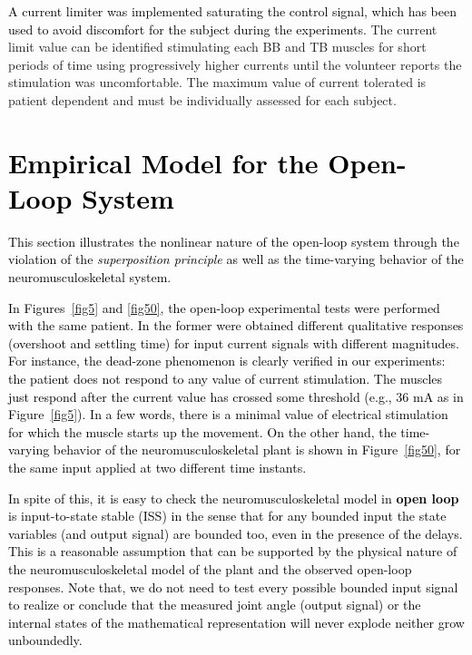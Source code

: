 \documentclass[review]{elsarticle}
\begin{document}
\textcolor{black}{
A current limiter was implemented saturating the control signal, which has been used to avoid discomfort for the subject during the experiments.} The current limit value can be identified stimulating each BB and TB muscles for short periods of time using progressively higher currents until the volunteer reports the stimulation was uncomfortable. The maximum value of current tolerated is patient dependent and must be individually assessed for each subject. 



\section{\textcolor{black}{Empirical Model for the Open-Loop System}}
\label{empirical}


\textcolor{black}{This section illustrates the nonlinear nature of the open-loop system
\textcolor{black}{through the violation of the} 
\textit{superposition principle} as well as the time-varying behavior of the neuromusculoskeletal system.}



\textcolor{black}{In Figures~\ref{fig5} and \ref{fig50}, the open-loop experimental tests were performed with the same patient. In the former
were obtained different qualitative responses (overshoot and settling time) for %
input current signals with different magnitudes. For instance, \textcolor{black}{the dead-zone phenomenon \cite{SNPHFFR:2005}} is clearly verified in our experiments: the patient does not respond to any value of current stimulation. The muscles just respond after the current value has crossed some threshold (e.g., 36 mA as in Figure~\ref{fig5}). In a few words, there is a minimal value of electrical stimulation for which the muscle starts up the movement. On the other hand, the time-varying behavior of the neuromusculoskeletal plant is shown in Figure~\ref{fig50}, for the same input \textcolor{black}{applied at two different time instants.}}




\textcolor{black}{In spite of this, it is easy to check the neuromusculoskeletal model in \textbf{open loop} is input-to-state stable (ISS) \cite[p. 175]{K:2002} in the sense that for any bounded input the state variables (and output signal) are bounded too, even in the presence of the delays. This is a reasonable assumption that can be supported by the physical nature of the neuromusculoskeletal model of the plant and the observed open-loop responses. Note that, we do not need to test every possible bounded input signal to realize or conclude that the measured joint angle (output signal) or the internal states of the mathematical representation will never explode neither grow unboundedly.}
\end{document}
